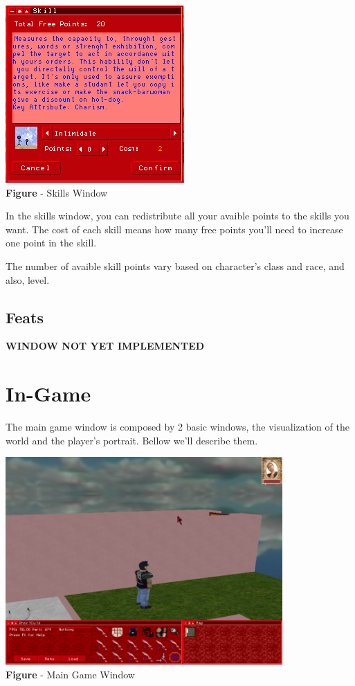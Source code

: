 \documentclass[ letterpaper,12pt]{article}
\begin{document}
\begin{center}
  \includegraphics{skillWindow.png}
\\{\bf Figure} - Skills Window
\end{center}

In the skills window, you can redistribute all your avaible points to the skills you want. The cost of each skill means how many free points you'll need to increase one point in the skill.

The number of avaible skill points vary based on character's class and race, and also, level.

\subsection{Feats}

{\bf WINDOW NOT YET IMPLEMENTED}

\section{In-Game}

The main game window is composed by 2 basic windows, the visualization of the world and the player's portrait. Bellow we'll describe them.

\begin{center}
  \includegraphics{mainGame.png}
\\{\bf Figure} - Main Game Window
\end{center}
\end{document}
